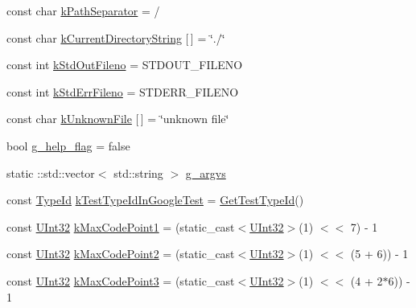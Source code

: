 \begin{DoxyCompactItemize}
\item 
const char \mbox{\hyperlink{namespacetesting_1_1internal_afcd71adaa9d1e6df7b282a17fc48125c}{k\+Path\+Separator}} = \textquotesingle{}/\textquotesingle{}
\item 
const char \mbox{\hyperlink{namespacetesting_1_1internal_a23a8e9527d0e544e7df2d64ad549ce3e}{k\+Current\+Directory\+String}} \mbox{[}$\,$\mbox{]} = \char`\"{}./\char`\"{}
\item 
const int \mbox{\hyperlink{namespacetesting_1_1internal_a24f0a3d50cac54a9132f4828ec9b96d9}{k\+Std\+Out\+Fileno}} = S\+T\+D\+O\+U\+T\+\_\+\+F\+I\+L\+E\+NO
\item 
const int \mbox{\hyperlink{namespacetesting_1_1internal_a747eccfdbdee3ff8af3bedc476a57c85}{k\+Std\+Err\+Fileno}} = S\+T\+D\+E\+R\+R\+\_\+\+F\+I\+L\+E\+NO
\item 
const char \mbox{\hyperlink{namespacetesting_1_1internal_abae7a5775c901f2fd12b058b00d09840}{k\+Unknown\+File}} \mbox{[}$\,$\mbox{]} = \char`\"{}unknown file\char`\"{}
\item 
bool \mbox{\hyperlink{namespacetesting_1_1internal_a93a772f5e51973b105d91cbb66a203f4}{g\+\_\+help\+\_\+flag}} = false
\item 
static \+::std\+::vector$<$ std\+::string $>$ \mbox{\hyperlink{namespacetesting_1_1internal_a1df44800b0d0c4eff5441c55ac9eb6a5}{g\+\_\+argvs}}
\item 
const \mbox{\hyperlink{namespacetesting_1_1internal_ab1114197d3c657d8b7f8e0c5caa12d00}{Type\+Id}} \mbox{\hyperlink{namespacetesting_1_1internal_acac7993efabbd9dd62c1e9c7d143a72f}{k\+Test\+Type\+Id\+In\+Google\+Test}} = \mbox{\hyperlink{namespacetesting_1_1internal_ad0d66d56ead224263cd100c1d6bfc562}{Get\+Test\+Type\+Id}}()
\item 
const \mbox{\hyperlink{namespacetesting_1_1internal_a40d4fffcd2bf56f18b1c380615aa85e3}{U\+Int32}} \mbox{\hyperlink{namespacetesting_1_1internal_a128515c8ed6c0fe98e498c8042da2060}{k\+Max\+Code\+Point1}} = (static\+\_\+cast$<$\mbox{\hyperlink{namespacetesting_1_1internal_a40d4fffcd2bf56f18b1c380615aa85e3}{U\+Int32}}$>$(1) $<$$<$ 7) -\/ 1
\item 
const \mbox{\hyperlink{namespacetesting_1_1internal_a40d4fffcd2bf56f18b1c380615aa85e3}{U\+Int32}} \mbox{\hyperlink{namespacetesting_1_1internal_ab8f4a5ed784352f00342cfeadc72337e}{k\+Max\+Code\+Point2}} = (static\+\_\+cast$<$\mbox{\hyperlink{namespacetesting_1_1internal_a40d4fffcd2bf56f18b1c380615aa85e3}{U\+Int32}}$>$(1) $<$$<$ (5 + 6)) -\/ 1
\item 
const \mbox{\hyperlink{namespacetesting_1_1internal_a40d4fffcd2bf56f18b1c380615aa85e3}{U\+Int32}} \mbox{\hyperlink{namespacetesting_1_1internal_aa42bd507418e570402996e33582beed3}{k\+Max\+Code\+Point3}} = (static\+\_\+cast$<$\mbox{\hyperlink{namespacetesting_1_1internal_a40d4fffcd2bf56f18b1c380615aa85e3}{U\+Int32}}$>$(1) $<$$<$ (4 + 2$\ast$6)) -\/ 1
$$
\end{DoxyCompactItemize}

